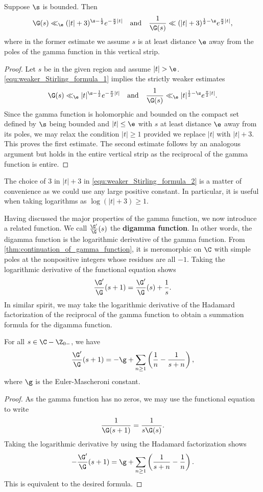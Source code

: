   \begin{corollary}\label{equ:weaker_Stirling_formula_2}
    Suppose \(\s\) is bounded. Then
    \[
      \G(s) \ll_{\e} (|t|+3)^{\s-\frac{1}{2}}e^{-\frac{\pi}{2}|t|} \quad \text{and} \quad \frac{1}{\G(s)} \ll (|t|+3)^{\frac{1}{2}-\s}e^{\frac{\pi}{2}|t|},
    \]
    where in the former estimate we assume \(s\) is at least distance \(\e\) away from the poles of the gamma function in this vertical strip.
  \end{corollary}
  \begin{proof}
    Let \(s\) be in the given region and assume \(|t| > \e\). \cref{equ:weaker_Stirling_formula_1} implies the strictly weaker estimates
    \[
      \G(s) \ll_{\e} |t|^{\s-\frac{1}{2}}e^{-\frac{\pi}{2}|t|} \quad \text{and} \quad \frac{1}{\G(s)} \ll_{\e} |t|^{\frac{1}{2}-\s}e^{\frac{\pi}{2}|t|}.
    \]
    Since the gamma function is holomorphic and bounded on the compact set defined by \(\s\) being bounded and \(|t| \le \e\) with \(s\) at least distance \(\e\) away from its poles, we may relax the condition \(|t| \ge 1\) provided we replace \(|t|\) with \(|t|+3\). This proves the first estimate. The second estimate follows by an analogous argument but holds in the entire vertical strip as the reciprocal of the gamma function is entire.
  \end{proof}

  The choice of \(3\) in \(|t|+3\) in \cref{equ:weaker_Stirling_formula_2} is a matter of convenience as we could use any large positive constant. In particular, it is useful when taking logarithms as \(\log(|t|+3) \ge 1\).

  Having discussed the major properties of the gamma function, we now introduce a related function. We call \(\frac{\G'}{\G}(s)\) the \textbf{digamma function}. In other words, the digamma function is the logarithmic derivative of the gamma function. From \cref{thm:continuation_of_gamma_function}, it is meromorphic on \(\C\) with simple poles at the nonpositive integers whose residues are all \(-1\). Taking the logarithmic derivative of the functional equation shows
  \[
    \frac{\G'}{\G}(s+1) = \frac{\G'}{\G}(s)+\frac{1}{s}.
  \]
  In similar spirit, we may take the logarithmic derivative of the Hadamard factorization of the reciprocal of the gamma function to obtain a summation formula for the digamma function.

  \begin{corollary}\label{cor:logarithmic_derivative_of_gamma}
    For all \(s \in \C-\Z_{0-}\), we have
    \[
      \frac{\G'}{\G}(s+1) = -\g+\sum_{n \ge 1}\left(\frac{1}{n}-\frac{1}{s+n}\right),
    \]
    where \(\g\) is the Euler-Mascheroni constant.
  \end{corollary}
  \begin{proof}
    As the gamma function has no zeros, we may use the functional equation to write
    \[
      \frac{1}{\G(s+1)} = \frac{1}{s\G(s)}.
    \]
    Taking the logarithmic derivative by using the Hadamard factorization shows
    \[
      -\frac{\G'}{\G}(s+1) = \g+\sum_{n \ge 1}\left(\frac{1}{s+n}-\frac{1}{n}\right).
    \]
    This is equivalent to the desired formula.
  \end{proof}

